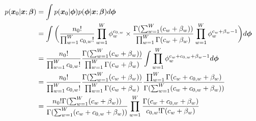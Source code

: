 \documentclass[aspectratio=169,unicode,dvipdfmx,14pt]{beamer}
\begin{document}
\begin{frame}
\FontMath
\begin{align}
p(\bm{x}_0|\bm{x};\bm{\beta}) & = \int p(\bm{x}_0|\bm{\phi})p(\bm{\phi}|\bm{x};\bm{\beta}) d\bm{\phi}
\notag \\ & =
\int \bigg(
\frac{n_0!}{\prod_{w=1}^W c_{0,w}!} \prod_{w=1}^W \phi_w^{c_{0,w}} \times
\frac{\Gamma(\sum_{w=1}^W (c_w + \beta_w))}{\prod_{w=1}^W \Gamma(c_w + \beta_w)}
\prod_{w=1}^W \phi_w^{c_w + \beta_w - 1} \bigg) d\bm{\phi}
\notag \\ & =
\frac{n_0!}{\prod_{w=1}^W c_{0,w}!}
\frac{\Gamma(\sum_{w=1}^W (c_w + \beta_w))}{\prod_{w=1}^W \Gamma(c_w + \beta_w)}
\int \prod_{w=1}^W \phi_w^{c_w + c_{0,w} + \beta_w - 1} d\bm{\phi}
\notag \\ & =
\frac{n_0!}{\prod_{w=1}^W c_{0,w}!}
\frac{\Gamma(\sum_{w=1}^W (c_w + \beta_w))}{\prod_{w=1}^W \Gamma(c_w + \beta_w)}
\frac{\prod_{w=1}^W \Gamma(c_w+c_{0,w}+\beta_w)}
{\Gamma( \sum_{w=1}^W (c_w + c_{0,w} + \beta_w) )}
\notag \\ & =
\frac{n_0! \Gamma(\sum_{w=1}^W (c_w + \beta_w))}{\Gamma( \sum_{w=1}^W (c_w + c_{0,w} + \beta_w) )}
\prod_{w=1}^W
\frac{\Gamma(c_w+c_{0,w}+\beta_w)}{c_{0,w}!\Gamma(c_w + \beta_w)}
\end{align}
\end{frame}
\end{document}
